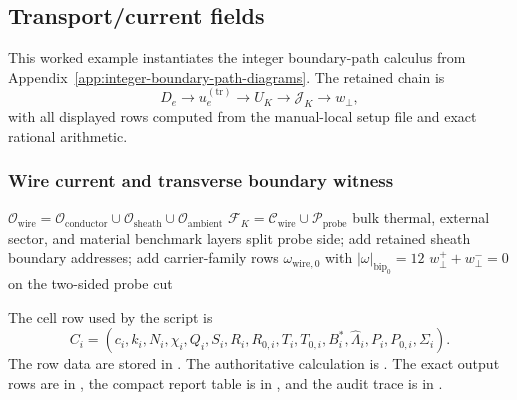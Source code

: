 \subsection{Transport/current fields}
\label{man:transport-current-fields}

This worked example instantiates the integer boundary-path calculus from Appendix~\ref{app:integer-boundary-path-diagrams}.  The retained chain is
\[
D_e\to u_e^{(\mathrm{tr})}\to U_K\to \mathcal J_K\to w_\perp,
\]
with all displayed rows computed from the manual-local setup file and exact rational arithmetic.

\subsubsection{Wire current and transverse boundary witness}
\label{man:wire-current-transverse-boundary-witness}

\RetentionBlock
{\(\mathcal O_{\mathrm{wire}}=\mathcal O_{\mathrm{conductor}}\cup\mathcal O_{\mathrm{sheath}}\cup\mathcal O_{\mathrm{ambient}}\)}
{\(\mathcal F_K=\mathcal C_{\mathrm{wire}}\cup\mathcal P_{\mathrm{probe}}\)}
{bulk thermal, external sector, and material benchmark layers}
{split probe side; add retained sheath boundary addresses; add carrier-family rows}
{\(\omega_{\mathrm{wire},0}\) with \(|\omega|_{\mathrm{bip}_0}=12\)}
{\(w_\perp^+ + w_\perp^- = 0\) on the two-sided probe cut}

The cell row used by the script is
\[
C_i=(c_i,k_i,N_i,\chi_i,Q_i,S_i,R_i,R_{0,i},T_i,T_{0,i},B_i^*,\widehat\Lambda_i,P_i,P_{0,i},\Sigma_i).
\]
The row data are stored in .  The authoritative calculation is .  The exact output rows are in , the compact report table is in , and the audit trace is in .

\begin{table}[H]
\centering
\caption{Compact exact report for the wire-current retained boundary rows.}
\label{tab:wire-current-compact-report}
\begin{threeparttable}
\scriptsize
{}
\end{threeparttable}
\end{table}

